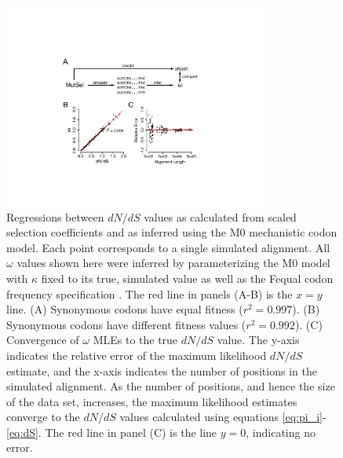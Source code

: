\documentclass{pnastwo}
\begin{document}
\begin{figure}[htbp]
	\centerline{\includegraphics[width=8.7cm]{figures/MainText/flowchart_regression_convergence.pdf}}
	\caption{\label{reg_conv} Regressions between $dN/dS$ values as calculated from scaled selection coefficients and as inferred using the M0 mechanistic codon model. Each point corresponds to a single simulated alignment. All $\omega$ values shown here were inferred by parameterizing the M0 model with $\kappa$ fixed to its true, simulated value as well as the Fequal codon frequency specification \cite{Yang2006}. The red line in panels (A-B) is the $x=y$ line. (A) Synonymous codons have equal fitness ($r^2=0.997$). (B) Synonymous codons have different fitness values ($r^2=0.992$). (C) Convergence of $\omega$ MLEs to the true $dN/dS$ value. The y-axis indicates the relative error of the maximum likelihood $dN/dS$ estimate, and the x-axis indicates the number of positions in the simulated alignment. As the number of positions, and hence the size of the data set, increases, the maximum likelihood estimates converge to the $dN/dS$ values calculated using equations \eqref{eq:pi_i}-\eqref{eq:dS}. The red line in panel (C) is the line $y=0$, indicating no error.}
\end{figure}
	
\vspace{2cm}
	
\end{document}
